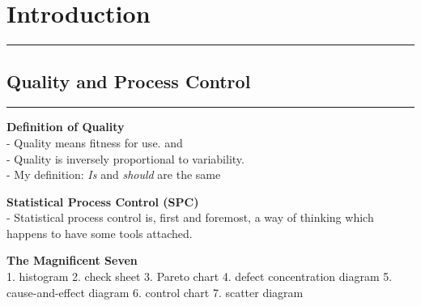 \section{Introduction}
\noindent\rule[\linienAbstand]{\linewidth}{\linienDickeDick}

\subsection{Quality and Process Control}
\noindent\rule[\linienAbstand]{\linewidth}{\linienDicke}
\textbf{Definition of Quality}\\
- Quality means fitness for use. and\\
- Quality is inversely proportional to variability.\\
- My definition: \emph{Is} and \emph{should} are the same


\textbf{Statistical Process Control (SPC)}\\
- Statistical process control is, first and foremost, a way of thinking which happens to have some tools attached.

\textbf{The Magnificent Seven}\\
1. histogram
2. check sheet
3. Pareto chart
4. defect concentration diagram
5. cause-and-effect diagram
6. control chart
7. scatter diagram
